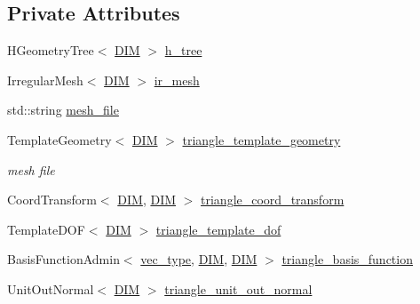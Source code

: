 \subsection*{Private Attributes}
\begin{DoxyCompactItemize}
\item 
H\+Geometry\+Tree$<$ \mbox{\hyperlink{complex__node___t_h_f_e_m_2uiexp_8h_a589b8b9bfdf714f736059845d568b597}{D\+IM}} $>$ \mbox{\hyperlink{classui_experiment_a7b3828699381e953e413984d65c27c76}{h\+\_\+tree}}
\item 
Irregular\+Mesh$<$ \mbox{\hyperlink{complex__node___t_h_f_e_m_2uiexp_8h_a589b8b9bfdf714f736059845d568b597}{D\+IM}} $>$ \mbox{\hyperlink{classui_experiment_a51e99f27dde8abd769e217d8192b1953}{ir\+\_\+mesh}}
\item 
std\+::string \mbox{\hyperlink{classui_experiment_ad22a4c3bcc758175bee8a9cc6112c37b}{mesh\+\_\+file}}
\item 
Template\+Geometry$<$ \mbox{\hyperlink{complex__node___t_h_f_e_m_2uiexp_8h_a589b8b9bfdf714f736059845d568b597}{D\+IM}} $>$ \mbox{\hyperlink{classui_experiment_a2c9abfb62147cb378fd5a7f52e99560e}{triangle\+\_\+template\+\_\+geometry}}
\begin{DoxyCompactList}\small\item\em mesh file \end{DoxyCompactList}\item 
Coord\+Transform$<$ \mbox{\hyperlink{complex__node___t_h_f_e_m_2uiexp_8h_a589b8b9bfdf714f736059845d568b597}{D\+IM}}, \mbox{\hyperlink{complex__node___t_h_f_e_m_2uiexp_8h_a589b8b9bfdf714f736059845d568b597}{D\+IM}} $>$ \mbox{\hyperlink{classui_experiment_a83ec25f4aedfaca2d4878b15efc82315}{triangle\+\_\+coord\+\_\+transform}}
\item 
Template\+D\+OF$<$ \mbox{\hyperlink{complex__node___t_h_f_e_m_2uiexp_8h_a589b8b9bfdf714f736059845d568b597}{D\+IM}} $>$ \mbox{\hyperlink{classui_experiment_a513ca14667fb30909ea3aef90e13200c}{triangle\+\_\+template\+\_\+dof}}
\item 
Basis\+Function\+Admin$<$ \mbox{\hyperlink{complex__edge___t_h_f_e_m_2emdefs_8h_a0a0de407de54661e0d56aa8686c104d9}{vec\+\_\+type}}, \mbox{\hyperlink{complex__node___t_h_f_e_m_2uiexp_8h_a589b8b9bfdf714f736059845d568b597}{D\+IM}}, \mbox{\hyperlink{complex__node___t_h_f_e_m_2uiexp_8h_a589b8b9bfdf714f736059845d568b597}{D\+IM}} $>$ \mbox{\hyperlink{classui_experiment_a4afff2bbca9b68fe61856dcf07456d2c}{triangle\+\_\+basis\+\_\+function}}
\item 
Unit\+Out\+Normal$<$ \mbox{\hyperlink{complex__node___t_h_f_e_m_2uiexp_8h_a589b8b9bfdf714f736059845d568b597}{D\+IM}} $>$ \mbox{\hyperlink{classui_experiment_a5105926d18f9fc118426f833b63fbec6}{triangle\+\_\+unit\+\_\+out\+\_\+normal}}

\end{DoxyCompactItemize}

